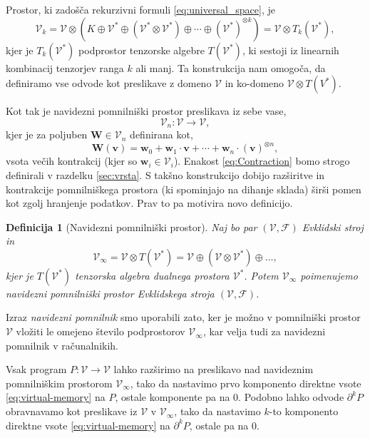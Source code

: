 \documentclass[a4paper, 12pt]{book}
\newcommand{\bfW}{\mathbf{W}}
\newcommand{\bfw}{\mathbf{w}}
\newcommand{\VV}{\mathcal{V}}
\newcommand{\vv}{\mathbf{v}}
\newcommand{\F}{\mathcal{F}}
\newcommand{\D}{\partial}
\newtheorem{definicija}{Definicija}[chapter]
\begin{document}
Prostor, ki zadošča rekurzivni formuli \eqref{eq:universal_space}, je
\begin{equation}
    \label{eq:k-th-virtual-space}
    \VV_k = \VV\otimes \left(K\oplus \VV^* \oplus (\VV^*\otimes \VV^*)\oplus\cdots\oplus
      (\VV^*)^{\otimes k}\right) = \VV\otimes T_k(\VV^*),
  \end{equation}
kjer je $T_k(\VV^*)$ podprostor tenzorske algebre $T(\VV^*)$, ki sestoji iz linearnih kombinacij tenzorjev ranga $k$ ali manj. Ta konstrukcija nam omogoča, da definiramo vse odvode kot preslikave z domeno $\VV$ in ko-domeno $\VV\otimes T(V^*)$.

Kot tak je navidezni pomnilniški prostor preslikava iz sebe vase,
\begin{equation}
\VV_n:\VV\to\VV,
\end{equation}
kjer je za poljuben $\bfW\in\VV_n$ definirana kot, 
\begin{equation}
\bfW(\vv)=\bfw_0+\bfw_1\cdot\vv+\cdots+\bfw_n\cdot(\vv)^{\otimes n}\label{eq:Contraction},
\end{equation}
vsota večih kontrakcij (kjer so $\bfw_i\in\VV_i$). Enakost \eqref{eq:Contraction} bomo strogo definirali v razdelku \ref{sec:vrsta}. S takšno konstrukcijo dobijo razširitve in kontrakcije pomnilniškega prostora (ki spominjajo na dihanje sklada) širši pomen kot zgolj hranjenje podatkov. Prav to pa motivira novo definicijo.
\begin{definicija}[Navidezni pomnilniški prostor]
Naj bo par $(\VV,\F)$ Evklidski stroj in
\begin{equation}
\VV_\infty = \VV\otimes T(\VV^*) = \VV\oplus
(\VV\otimes\VV^*)\oplus\ldots,\label{eq:virtual-memory}
\end{equation}
kjer je $T(\VV^*)$ tenzorska algebra dualnega prostora $\VV^*$. Potem $\VV_\infty$ poimenujemo \emph{navidezni pomnilniški prostor} Evklidskega stroja $(\VV,\F)$.
\end{definicija}
Izraz \emph{navidezni pomnilnik} smo uporabili zato, ker je možno v pomnilniški prostor $\VV$ vložiti le omejeno število podprostorov $\VV_\infty$, kar velja tudi za navidezni pomnilnik v računalnikih.

Vsak program $P:\VV\to\VV$ lahko razširimo na preslikavo nad navideznim pomnilniškim prostorom $\VV_\infty$, tako da nastavimo prvo komponento direktne vsote \eqref{eq:virtual-memory} na $P$, ostale komponente pa na $0$. Podobno lahko odvode $\D^k P$ obravnavamo kot preslikave iz $\VV$ v $\VV_\infty$, tako da nastavimo $k$-to komponento direktne vsote \eqref{eq:virtual-memory} na $\D^k P$, ostale pa na $0$.
\end{document}
